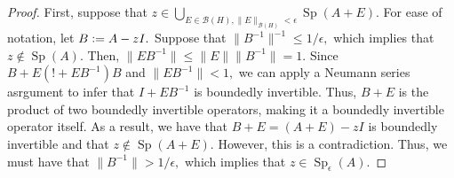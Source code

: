 \documentclass[12pt,a4paper]{article}
\newcommand{\defeq}{\vcentcolon=}
\newcommand{\Sp}[1]{\operatorname{Sp}\!\left(#1\right)}
\newcommand{\Spe}[1]{\operatorname{Sp}_{\epsilon}\!\left(#1\right)}
\theoremstyle{boldthm}
\theoremstyle{bolddefn}
\begin{document}
\begin{proof}
    First, suppose that $z \in \bigcup_{E \in \mathcal{B}(H), \|E\|_{\mathcal{B}(H)} < \epsilon} \operatorname{Sp}(A+E).$ For ease of notation, let $B \defeq A-zI.$ Suppose that $\|B^{-1}\|^{-1} \le 1/\epsilon,$ which implies that $z \notin \Sp{A}.$ Then, $\|EB^{-1} \| \le \|E\|\|B^{-1} \| = 1.$ Since $B+E (!+EB^{-1})B$ and $\|EB^{-1}\| < 1,$ we can apply a Neumann series asrgument  to infer that $I + EB^{-1}$ is boundedly invertible. Thus, $B+E$ is the product of two boundedly invertible operators, making it a boundedly invertible operator itself. As a result, we have that $B + E = (A+E)-zI$ is boundedly invertible and that $z \notin \Sp{A+E}.$ However, this is a contradiction. Thus, we must have that $\|B^{-1}\| > 1/\epsilon,$ which implies that $z \in \Spe{A}.$


\end{proof}
\end{document}
